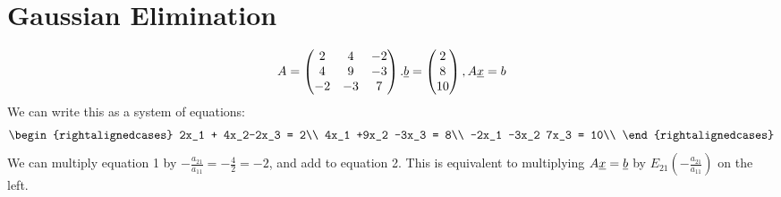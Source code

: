 \chapter{Gaussian Elimination}
\begin{example}
\[
A = \begin{pmatrix}
2 & 4 & -2 \\
4 & 9 & -3\\
-2 & -3 & 7
\end{pmatrix}. \underline{b}=\begin{pmatrix}
2\\
8\\
10
\end{pmatrix}, A\underline{x}= b
\]	
We can write this as a system of equations:
\[
\begin{rightalignedcases}
2x_1 + 4x_2-2x_3 = 2\\
4x_1 +9x_2 -3x_3 = 8\\
-2x_1 -3x_2 7x_3 = 10\\	
\end{rightalignedcases}
\]
We can multiply equation 1 by $-\frac{a_{21}}{a_{11}}= -\frac{4}{2} = -2$, and add to equation 2. This is equivalent to multiplying $A\underline{x} = \underline{b}$ by $E_{21}\left( -\frac{a_{21}}{a_{11}}\right)$ on the left. 


\end{example}
